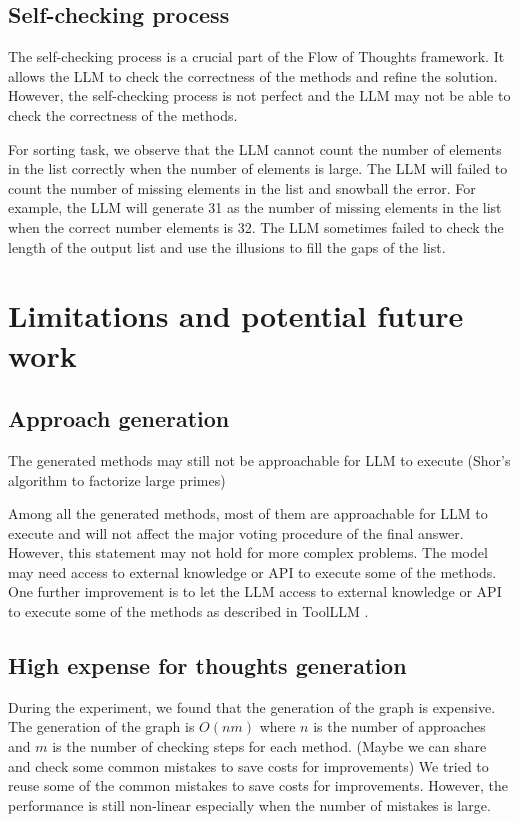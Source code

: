 \documentclass{article}
\begin{document}
\subsection{Self-checking process}

The self-checking process is a crucial part of the Flow of Thoughts framework. It allows the LLM to check the correctness of the methods and refine the solution. However, the self-checking process is not perfect and the LLM may not be able to check the correctness of the methods.

For sorting task, we observe that the LLM cannot count the number of elements in the list correctly when the number of elements is large. The LLM will failed to count the number of missing elements in the list and snowball the error. For example, the LLM will generate 31 as the number of missing elements in the list when the correct number elements is 32. The LLM sometimes failed to check the length of the output list and use the illusions to fill the gaps of the list.

\section{Limitations and potential future work}

\subsection{Approach generation}
The generated methods may still not be approachable for LLM to execute (Shor's algorithm to factorize large primes)

Among all the generated methods, most of them are approachable for LLM to execute and will not affect the major voting procedure of the final answer. However, this statement may not hold for more complex problems. The model may need access to external knowledge or API to execute some of the methods. One further improvement is to let the LLM access to external knowledge or API to execute some of the methods as described in ToolLLM \cite{qin2023toolllmfacilitatinglargelanguage}.

\subsection{High expense for thoughts generation}

During the experiment, we found that the generation of the graph is expensive. The generation of the graph is $O(nm)$ where $n$ is the number of approaches and $m$ is the number of checking steps for each method. (Maybe we can share and check some common mistakes to save costs for improvements) We tried to reuse some of the common mistakes to save costs for improvements. However, the performance is still non-linear especially when the number of mistakes is large.
\end{document}
